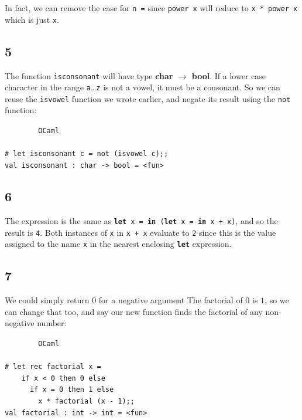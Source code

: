 \documentclass[]{book}
\newcommand\upquote[1]{\textquotesingle#1\textquotesingle}
\newcommand{\smspace}{\vspace{4mm}}
\begin{document}
\noindent In fact, we can remove the case for \texttt{n\! =} since \texttt{power\! x} will reduce to \texttt{x\! *\! power\! x} which is just \texttt{x}.

\subsection*{5}
The function \texttt{isconsonant} will have type \textbf{\textrm{char $\rightarrow$ bool}}. If a lower case character in the range \texttt{\upquote{a}}\ldots\texttt{\upquote{z}} is not a vowel, it must be a consonant. So we can reuse the \texttt{isvowel} function we wrote earlier, and negate its result using the \texttt{not} function:

\smspace
\noindent\verb!        OCaml!\\
\noindent\\
\noindent\verb!# let isconsonant c = not (isvowel c);;!\\
\noindent\verb!val isconsonant : char -> bool = <fun>!

\subsection*{6}
The expression is the same as \texttt{\textbf{let}\! x\! =\! \textbf{in}\! (\textbf{let}\! x\! =\! \textbf{in}\! x\! +\! x)}, and so the result is \texttt{4}. Both instances of \texttt{x} in \texttt{x\! +\! x} evaluate to \texttt{2} since this is the value assigned to the name \texttt{x} in the nearest enclosing \texttt{\textbf{let}} expression.

\subsection*{7}
We could simply return $0$ for a negative argument The factorial of $0$ is $1$, so we can change that too, and say our new function finds the factorial of any non-negative number:


\smspace
\noindent\verb!        OCaml!\\
\noindent\\
\noindent\verb!# let rec factorial x =!\\
\noindent\verb!    if x < 0 then 0 else!\\
\noindent\verb!      if x = 0 then 1 else!\\
\noindent\verb!        x * factorial (x - 1);;!\\
\noindent\verb!val factorial : int -> int = <fun>!
\smspace
\end{document}
